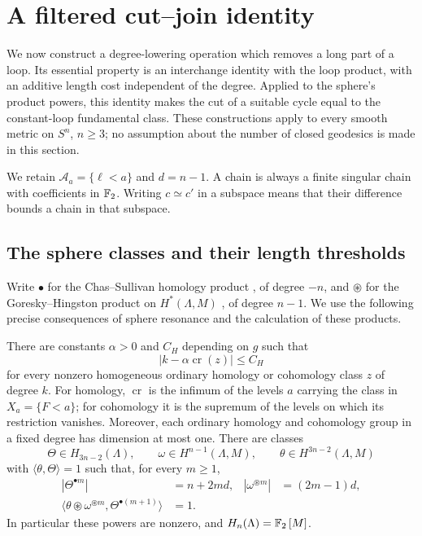 \section{A filtered cut--join identity}\label{sec:cutjoin}

We now construct a degree-lowering operation which removes a long part of
a loop.  Its essential property is an interchange identity with the loop
product, with an additive length cost independent of the degree.  Applied to the
sphere's product powers, this identity makes the cut of a suitable cycle
equal to the constant-loop fundamental class.  These constructions apply
to every smooth metric on $S^n$, $n\ge3$; no assumption about the number
of closed geodesics is made in this section.

We retain $\mathcal A_a=\{\ell<a\}$ and $d=n-1$.  A chain is always a finite
singular chain with coefficients in $\mathbb F_2$.  Writing $c\simeq c'$ in a
subspace means that their difference bounds a chain in that subspace.

\subsection{The sphere classes and their length thresholds}

Write $\bullet$ for the Chas--Sullivan homology product
\cite{ChasSullivan1999}, of degree $-n$,
and $\circledast$ for the Goresky--Hingston product on
$H^*(\Lambda,M)$ \cite{GoreskyHingston2009}, of degree $n-1$.
We use the following precise
consequences of sphere resonance and the calculation of these products.

\begin{proposition}\label{prop:sphere-powers}
There are constants $\alpha>0$ and $C_H$ depending on $g$ such that
\begin{equation}\label{eq:cj-resonance}
 \bigl|k-\alpha\operatorname{cr}(z)\bigr|\le C_H
\end{equation}
for every nonzero homogeneous ordinary homology or cohomology class $z$
of degree $k$.  For homology, $\operatorname{cr}$ is the infimum of the
levels $a$ carrying the class in $X_a=\{F<a\}$; for cohomology it is
the supremum of the levels on which its restriction vanishes.
Moreover, each ordinary homology and cohomology group in a fixed degree
has dimension at most one.  There are classes
\[
 \Theta\in H_{3n-2}(\Lambda),\qquad
 \omega\in H^{n-1}(\Lambda,M),\qquad
 \theta\in H^{3n-2}(\Lambda,M)
\]
with $\langle\theta,\Theta\rangle=1$ such that, for every $m\ge1$,
\begin{align}
 |\Theta^{\bullet m}|&=n+2md,&
 |\omega^{\circledast m}|&=(2m-1)d,\label{eq:cj-power-degrees}\\
 \bigl\langle\theta\circledast\omega^{\circledast m},
          \Theta^{\bullet(m+1)}\bigr\rangle&=1.
 \label{eq:cj-power-pairing}
\end{align}
In particular these powers are nonzero, and
$H_n(\Lambda)=\mathbb F_2\,[M]$.
\end{proposition}

